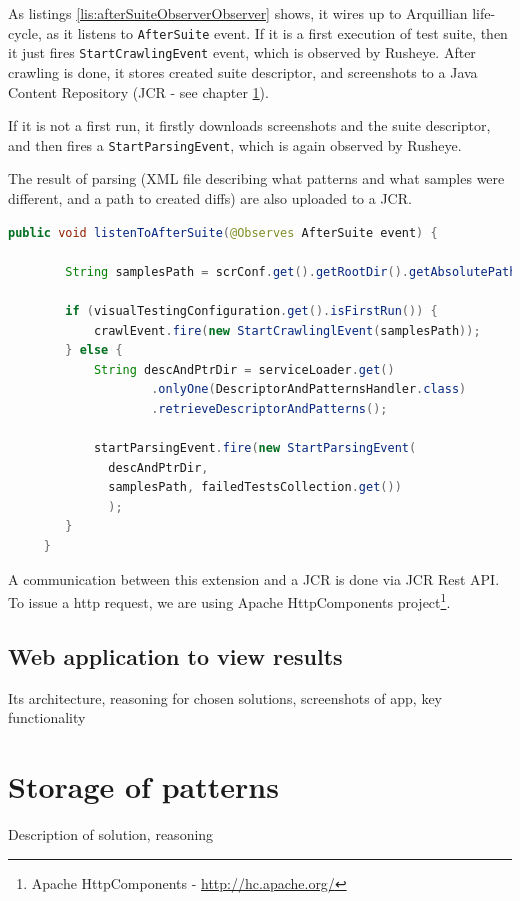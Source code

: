 \documentclass[11pt,oneside,final]{fithesis2}
\begin{document}
    As listings \ref{lis:afterSuiteObserverObserver} shows, it wires up to Arquillian life-cycle, as it listens to \texttt{AfterSuite} event. 
    If it is a first execution of test suite, then it just fires \texttt{StartCrawlingEvent} event, which is observed by Rusheye. 
    After crawling is done, it stores created suite descriptor, and screenshots to a Java Content Repository 
    (JCR - see chapter \ref{chap:storage}).
    
    If it is not a first run, it firstly downloads screenshots and the suite descriptor, and then fires a \texttt{StartParsingEvent}, 
    which is again observed by Rusheye.
    
    The result of parsing (XML file describing what patterns and what samples were different, and a path to created diffs) are also uploaded
    to a JCR.
    
    \begin{lstlisting}[caption=AfterSuite observer to controll Rusheye,label=lis:afterSuiteObserverObserver,language=java]
     public void listenToAfterSuite(@Observes AfterSuite event) {
        
        String samplesPath = scrConf.get().getRootDir().getAbsolutePath();
        
        if (visualTestingConfiguration.get().isFirstRun()) {
            crawlEvent.fire(new StartCrawlinglEvent(samplesPath));
        } else {
            String descAndPtrDir = serviceLoader.get()
                    .onlyOne(DescriptorAndPatternsHandler.class)
                    .retrieveDescriptorAndPatterns();
            
            startParsingEvent.fire(new StartParsingEvent(
		      descAndPtrDir,
		      samplesPath, failedTestsCollection.get())
		      );
        }
     }
    \end{lstlisting}
    
    A communication between this extension and a JCR is done via JCR Rest API. To issue a http request, we are using Apache HttpComponents
    project\footnote{Apache HttpComponents - \url{http://hc.apache.org/}}.
 
    \subsection{Web application to view results}
    Its architecture, reasoning for chosen solutions, screenshots of app, key functionality
        
\section{Storage of patterns}
\label{chap:storage}
    Description of solution, reasoning
    
\end{document}
